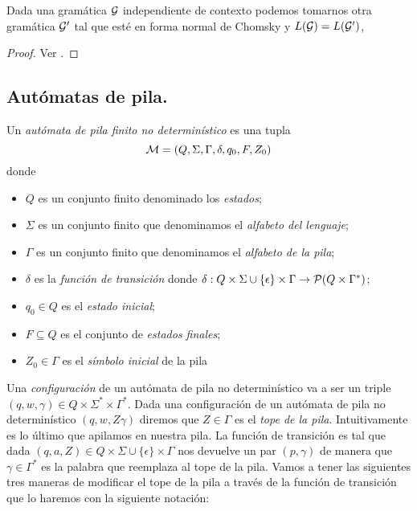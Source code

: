 \documentclass[tesis.tex]{subfiles}
\begin{document}
\begin{prop}\label{prop_fn_Chomsky}
	Dada una gramática $\cal G$ independiente de contexto podemos tomarnos otra gramática $\cal G'$ tal que esté en forma normal de Chomsky y $L({\cal G}) = L(\cal G')$,
\end{prop}

\begin{proof}
	Ver \cite{hopcraft-ullman}.
\end{proof}

\subsection{Autómatas de pila.}

\begin{deff}\label{deff_apnd}
	Un \emph{autómata de pila finito no determinístico} es una tupla 
	\[
	{\cal M } = (Q, \Sigma, \Gamma, \delta, q_0, F, Z_0)
	\]
	donde 
	\begin{itemize}
		\item $Q$ es un conjunto finito denominado los \emph{estados};
		\item $\Sigma$ es un conjunto finito que denominamos el \emph{alfabeto del lenguaje};
		\item $\Gamma$ es un conjunto finito que denominamos el \emph{alfabeto de la pila};
		\item $\delta$ es la \emph{función de transición} donde $\delta: Q  \times \Sigma \cup \{ \epsilon \} \times \Gamma \to {\cal P}( Q  \times \Gamma^*)$;
		\item $q_0 \in Q$ es el \emph{estado inicial};
		\item $F \subseteq Q$ es el conjunto de \emph{estados finales};
		\item $Z_{0} \in \Gamma$ es el \emph{símbolo inicial} de la pila
	\end{itemize}
\end{deff}

Una \emph{configuración} de un autómata de pila no determinístico va a ser un triple $(q,w,\gamma) \in Q \times \Sigma^* \times \Gamma^*$.
Dada una configuración de un autómata de pila no determinístico $(q,w, Z\gamma)$ diremos que $Z \in \Gamma$ es el \emph{tope de la pila}.
Intuitivamente es lo último que apilamos en nuestra pila.
La función de transición es tal que dada $(q,a,Z) \in Q  \times \Sigma \cup \{ \epsilon \} \times \Gamma $ nos devuelve un par $(p,\gamma)$ de manera que $\gamma \in \Gamma^{*}$ es la palabra que reemplaza al tope de la pila.
Vamos a tener las siguientes tres maneras de modificar el tope de la pila a través de la función de transición que lo haremos con la siguiente notación:
\end{document}
